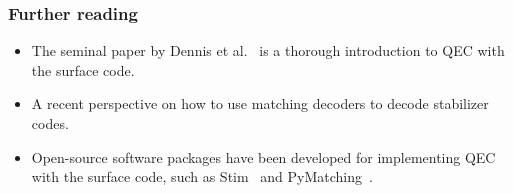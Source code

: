 \begin{refsection}

\subsubsection*{Further reading}

\begin{itemize}
    \item The seminal paper by Dennis et al.~\cite{dennis2002TopologicalQuantumMemory} is a thorough introduction to QEC with the surface code.
    \item A recent perspective \cite{brown2023conservationLawsQEC} on how to use matching decoders to decode stabilizer codes.
    \item Open-source software packages have been developed for implementing QEC with the surface code, such as Stim~\cite{gidney2021Stim} and PyMatching~\cite{higgott2021PyMatching}.
\end{itemize}

\printbibliography[heading=secbib,segment=\therefsegment]

\end{refsection}
 

\newpage 



